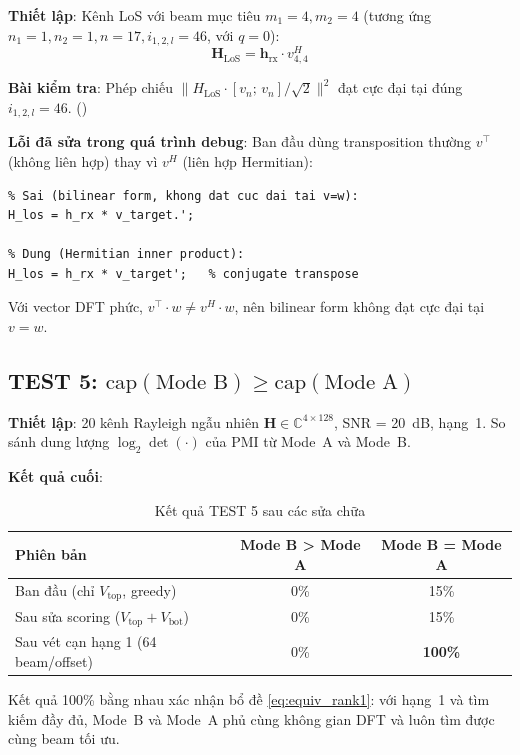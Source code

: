 \documentclass[11pt,a4paper]{article}
\begin{document}
\noindent\textbf{Thiết lập}: Kênh LoS với beam mục tiêu $m_1=4, m_2=4$
(tương ứng $n_1=1, n_2=1, n=17, i_{1,2,l}=46$, với $q=0$):
\begin{equation}
  \mathbf{H}_\text{LoS} = \mathbf{h}_\text{rx} \cdot v_{4,4}^H
\end{equation}

\noindent\textbf{Bài kiểm tra}: Phép chiếu $\|H_\text{LoS} \cdot [v_n;\, v_n]/\sqrt{2}\|^2$
đạt cực đại tại đúng $i_{1,2,l} = 46$. (\checkmark)

\noindent\textbf{Lỗi đã sửa trong quá trình debug}: Ban đầu dùng transposition thường
$v^\top$ (không liên hợp) thay vì $v^H$ (liên hợp Hermitian):
\begin{lstlisting}
% Sai (bilinear form, khong dat cuc dai tai v=w):
H_los = h_rx * v_target.';

% Dung (Hermitian inner product):
H_los = h_rx * v_target';   % conjugate transpose
\end{lstlisting}
Với vector DFT phức, $v^\top \cdot w \neq v^H \cdot w$, nên bilinear form
không đạt cực đại tại $v = w$.

\subsection{TEST 5: $\text{cap}(\text{Mode~B}) \geq \text{cap}(\text{Mode~A})$}

\noindent\textbf{Thiết lập}: 20 kênh Rayleigh ngẫu nhiên
$\mathbf{H} \in \mathbb{C}^{4 \times 128}$, SNR = 20~dB, hạng~1.
So sánh dung lượng $\log_2\det(\cdot)$ của PMI từ Mode~A và Mode~B.

\noindent\textbf{Kết quả cuối}:

\begin{table}[H]
\centering
\caption{Kết quả TEST 5 sau các sửa chữa}
\begin{tabular}{lcc}
\toprule
Phiên bản & Mode B > Mode A & Mode B = Mode A \\
\midrule
Ban đầu (chỉ $V_\text{top}$, greedy) & 0\% & 15\% \\
Sau sửa scoring ($V_\text{top} + V_\text{bot}$) & 0\% & 15\% \\
Sau vét cạn hạng 1 (64 beam/offset) & 0\% & \textbf{100\%} \\
\bottomrule
\end{tabular}
\end{table}

\noindent Kết quả 100\% bằng nhau xác nhận bổ đề \eqref{eq:equiv_rank1}:
với hạng~1 và tìm kiếm đầy đủ, Mode~B và Mode~A phủ cùng không gian DFT
và luôn tìm được cùng beam tối ưu.
\end{document}
